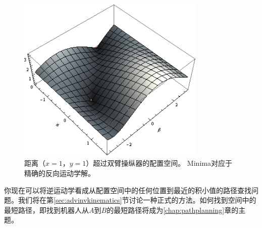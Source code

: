 \begin{figure}
	\centering
		\includegraphics[width=0.8\textwidth]{figs/inversekinematics}
	\caption{距离$（x = 1，y = 1）$超过双臂操纵器的配置空间。 Minima对应于精确的反向运动学解。}
	\label{fig:inversekinematics}
\end{figure}


你现在可以将逆运动学看成从配置空间中的任何位置到最近的积小值的路径查找问题。我们将在第\ref{sec:advinvkinematics}节讨论一种正式的方法。如何找到空间中的最短路径，即找到机器人从$A$到$B$的最短路径将成为\ref{chap:pathplanning}章的主题。


